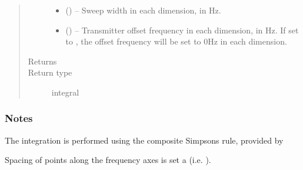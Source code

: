 \documentclass[letterpaper,10pt,english]{sphinxmanual}
\begin{document}
\begin{fulllineitems}
\begin{quote}
\begin{description}
\begin{itemize}
\item {} 
\sphinxAtStartPar
{} (\sphinxstyleliteralemphasis{\sphinxupquote{{[}}}\sphinxstyleliteralemphasis{\sphinxupquote{{]}}}\sphinxstyleliteralemphasis{\sphinxupquote{, }}\sphinxstyleliteralemphasis{\sphinxupquote{{[}}}\sphinxstyleliteralemphasis{\sphinxupquote{, }}\sphinxstyleliteralemphasis{\sphinxupquote{{]}}}) – Sweep width in each dimension, in Hz.

\item {} 
\sphinxAtStartPar
{} (\sphinxstyleliteralemphasis{\sphinxupquote{{[}}}\sphinxstyleliteralemphasis{\sphinxupquote{{]}}}\sphinxstyleliteralemphasis{\sphinxupquote{, }}\sphinxstyleliteralemphasis{\sphinxupquote{{[}}}\sphinxstyleliteralemphasis{\sphinxupquote{, }}\sphinxstyleliteralemphasis{\sphinxupquote{{]}}}\sphinxstyleliteralemphasis{\sphinxupquote{, }}) – Transmitter offset frequency in each dimension, in Hz. If set to
, the offset frequency will be set to 0Hz in each dimension.

\end{itemize}

\item[{Returns}] \leavevmode
\sphinxAtStartPar


\item[{Return type}] \leavevmode
\sphinxAtStartPar
integral

\end{description}\end{quote}
\subsubsection*{Notes}

\sphinxAtStartPar
The integration is performed using the composite Simpsons rule, provided
by 

\sphinxAtStartPar
Spacing of points along the frequency axes is set a  (i.e. ).

\end{fulllineitems}
\end{document}
